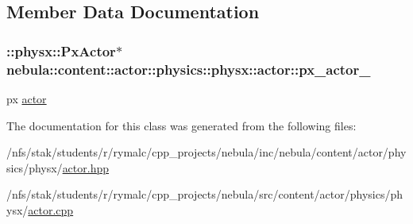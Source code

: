 \subsection{Member Data Documentation}
\hypertarget{classnebula_1_1content_1_1actor_1_1physics_1_1physx_1_1actor_a89bbc3e0d34ee15236e76e212cd96902}{
\subsubsection[{px\_\-actor\_\-}]{\setlength{\rightskip}{0pt plus 5cm}::physx::PxActor$\ast$ {\bf nebula::content::actor::physics::physx::actor::px\_\-actor\_\-}}}
\label{classnebula_1_1content_1_1actor_1_1physics_1_1physx_1_1actor_a89bbc3e0d34ee15236e76e212cd96902}


px \hyperlink{classnebula_1_1content_1_1actor_1_1physics_1_1physx_1_1actor}{actor} 

The documentation for this class was generated from the following files:\begin{DoxyCompactItemize}
\item 
/nfs/stak/students/r/rymalc/cpp\_\-projects/nebula/inc/nebula/content/actor/physics/physx/\hyperlink{physics_2physx_2actor_8hpp}{actor.hpp}\item 
/nfs/stak/students/r/rymalc/cpp\_\-projects/nebula/src/content/actor/physics/physx/\hyperlink{physics_2physx_2actor_8cpp}{actor.cpp}\end{DoxyCompactItemize}
